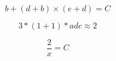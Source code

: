 \begin{displaymath}
 b  + (d + b) \times (e + d) = C
\end{displaymath}

\[
3*(1+1)*adc \approx 2
\]

\[
\frac{2}{x}  = C
\]


